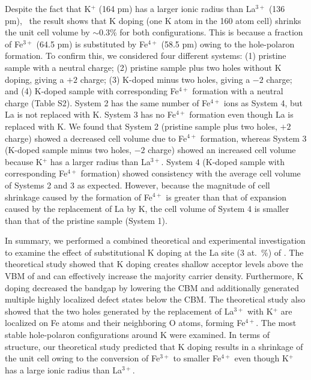 Despite the fact that K$^+$ (164 pm) has a larger ionic radius than La$^{3+}$ (136 pm),~\cite{shannon1976revised} the result shows that K doping (one K atom in the 160 atom cell) shrinks the unit cell volume by $\sim$0.3\% for both configurations. This is because a fraction of Fe$^{3+}$ (64.5 pm) is substituted by Fe$^{4+}$ (58.5 pm) owing to the hole-polaron formation. To confirm this, we considered four different systems: (1) pristine sample with a neutral charge; (2) pristine sample plus two holes without K doping, giving a $+2$ charge; (3) K-doped minus two holes, giving a $-2$ charge; and (4) K-doped sample with corresponding Fe$^{4+}$ formation with a neutral charge (Table S2). System 2 has the same number of Fe$^{4+}$ ions as System 4, but La is not replaced with K. System 3 has no Fe$^{4+}$ formation even though La is replaced with K. We found that System 2 (pristine sample plus two holes, $+2$ charge) showed a decreased cell volume due to Fe$^{4+}$ formation, whereas System 3 (K-doped sample minus two holes, $-2$ charge) showed an increased cell volume because K$^+$ has a larger radius than La$^{3+}$. System 4 (K-doped sample with corresponding Fe$^{4+}$ formation) showed consistency with the average cell volume of Systems 2 and 3 as expected. However, because the magnitude of cell shrinkage caused by the formation of Fe$^{4+}$ is greater than that of expansion caused by the replacement of La by K, the cell volume of System 4 is smaller than that of the pristine sample (System 1).


In summary, we performed a combined theoretical and experimental investigation to examine the effect of substitutional K doping at the La site (3 at.\ \%) of . The theoretical study showed that K doping creates shallow acceptor levels above the VBM of  and can effectively increase the majority carrier density. Furthermore, K doping decreased the bandgap by lowering the CBM and additionally generated multiple highly localized defect states below the CBM. The theoretical study also showed that the two holes generated by the replacement of La$^{3+}$ with K$^+$ are localized on Fe atoms and their neighboring O atoms, forming Fe$^{4+}$. The most stable hole-polaron configurations around K were examined. In terms of structure, our theoretical study predicted that K doping results in a shrinkage of the unit cell owing to the conversion of Fe$^{3+}$ to smaller Fe$^{4+}$ even though K$^+$ has a large ionic radius than La$^{3+}$.

